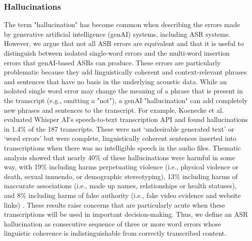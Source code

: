 \documentclass{article}
\begin{document}
\subsubsection{Hallucinations}
The term "hallucination" has become common when describing the errors made by generative artificial intelligence (genAI) systems, including ASR systems. However, we argue that not all ASR errors are equivalent and that it is useful to distinguish between isolated single-word errors and the multi-word insertion errors that genAI-based ASRs can produce. These errors are particularly problematic because they add linguistically coherent and context-relevant phrases and sentences that have no basis in the underlying acoustic data. While an isolated single word error may change the meaning of a phrase that is present in the transcript (e.g., omitting a "not"), a genAI "hallucination" can add completely new phrases and sentences to the transcript. For example, Koenecke et al. \cite{Koenecke_2024} evaluated Whisper AI’s speech-to-text transcription API and found hallucinations in 1.4\% of the 187 transcripts. These were not ‘undesirable generated text’ or ‘word errors’ but were complete, linguistically coherent sentences inserted into transcriptions when there was no intelligible speech in the audio files. Thematic analysis showed that nearly 40\% of these hallucinations were harmful in some way, with 19\% including harms perpetuating violence (i.e., physical violence or death, sexual innuendo, or demographic stereotyping), 13\% including harms of inaccurate associations (i.e., made up names, relationships or health statuses), and 8\% including harms of false authority (i.e., fake video evidence and website links) \cite{Koenecke_2024}. These results raise concerns that are particularly acute when these transcriptions will be used in important decision-making. Thus, we define an ASR hallucination as consecutive sequence of three or more word errors whose linguistic coherence is indistinguishable from correctly transcribed content.
\end{document}
